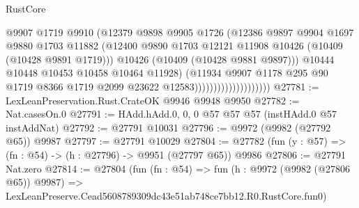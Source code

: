 \begin{lexlean}{RustCore}
\begin{coremodule}
                                          @9907
                                          @1719
                                          @9910
                                          (@12379
                                            @9898
                                            @9905
                                            @1726
                                            (@12386
                                              @9897
                                              @9904
                                              @1697
                                              @9880
                                              @1703
                                              @11882
                                              (@12400
                                                @9890
                                                @1703
                                                @12121
                                                @11908
                                                @10426
                                                (@10409 (@10428 @9891 @1719)))
                                              @10426
                                              (@10409 (@10428 @9881 @9897)))
                                            @10444
                                            @10448
                                            @10453
                                            @10458
                                            @10464
                                            @11928)
                                          (@11934
                                            @9907
                                            @1178
                                            @295
                                            @90
                                            @1719
                                            @8366
                                            @1719
                                            @2099
                                            @23622
                                            @12583))))))))))))))))))))
@27781 := LexLeanPreservation.Rust.CrateOK @9946 @9948 @9950
@27782 := Nat.casesOn.{0}
@27791 := HAdd.hAdd.{0, 0, 0} @57 @57 @57 (instHAdd.{0} @57 instAddNat)
@27792 := @27791 @10031
@27796 := @9972 (@9982 (@27792 @65)) @9987
@27797 := @27791 @10029
@27804 := @27782 (fun (y : @57) => (fn : @54) -> (h : @27796) -> @9951 (@27797 @65)) @9986
@27806 := @27791 Nat.zero
@27814 := @27804
    (fun (fn : @54) =>
    fun (h : @9972 (@9982 (@27806 @65)) @9987) =>
    LexLeanPreserve.Cead5608789309dc43e51ab748ce7bb12.R0.RustCore.fun0)

\end{coremodule}
\end{lexlean}
